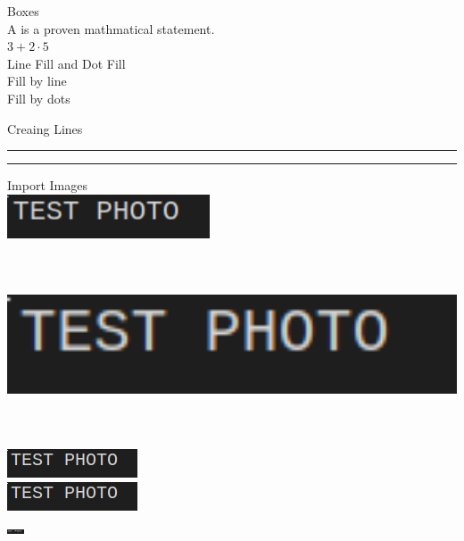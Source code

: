 \documentclass{article}
\begin{document}
    {\Large Boxes}\\[15pt]
    A  is a proven mathmatical statement.\\
    $\boxed{3+\boxed{2 \cdot 5}}$\\[15pt]

    {\Large Line Fill and Dot Fill}\\[15pt]
    Fill by line \hrulefill\\
    Fill by dots \dotfill\\
    \noindent \hrulefill

    \newpage

    {\Large Creaing Lines}\\
    \rule{\linewidth}{0.4pt}
    \begin{center}
        \rule{3cm}{0.5cm}
    \end{center}

    {\Large Import Images}\\
    \includegraphics[width=6cm]{test_photo.png}\\
    \includegraphics[height=6cm]{test_photo.png}\\
    \includegraphics[width=0.5\linewidth]{test_photo.png}\\
    \includegraphics[scale=1.5]{test_photo.png}\\
    \includegraphics[width=0.5cm,height=1cm]{test_photo.png}\\
    
\end{document}
